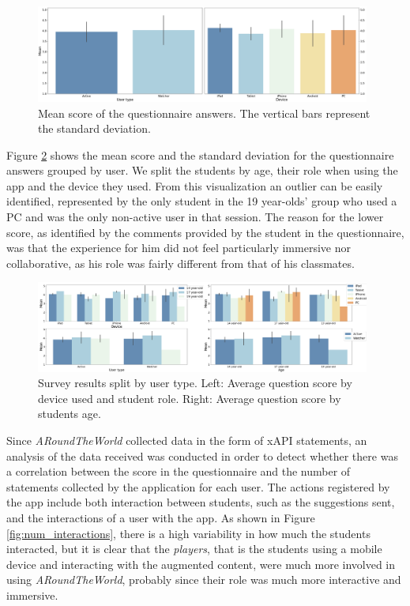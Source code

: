 \documentclass[pdflatex,sn-basic,iicol]{sn-jnl}%
\def\appname/{\textit{ARoundTheWorld}}
\begin{document}
\begin{figure}[htbp]
    \centering
    \includegraphics[width=0.98\textwidth]{imgs/survey_results_type_2.png}
    \caption{Mean score of the questionnaire answers. The vertical bars represent the standard deviation.}
    \label{fig:survey_split}
\end{figure}

Figure \ref{fig:survey_split_grouped} shows the mean score and the standard deviation for the questionnaire answers grouped by user. We split the students by age, their role when using the app and the device they used. From this visualization an outlier can be easily identified, represented by the only student in the 19 year-olds' group who used a PC and was the only non-active user in that session. The reason for the lower score, as identified by the comments provided by the student in the questionnaire, was that the experience for him did not feel particularly immersive nor collaborative, as his role was fairly different from that of his classmates. 

\begin{figure}[htbp]
    \centering
    \includegraphics[width=0.98\textwidth]{imgs/survey_results_grouped_2.png}
    \caption{Survey results split by user type. Left: Average question score by device used and student role. Right: Average question score by students age.}
    \label{fig:survey_split_grouped}
\end{figure}

Since \appname/ collected data in the form of xAPI statements, an analysis of the data received was conducted in order to detect whether there was a correlation between the score in the questionnaire and the number of statements collected by the application for each user. The actions registered by the app include both interaction between students, such as the suggestions sent, and the interactions of a user with the app. As shown in Figure \ref{fig:num_interactions}, there is a high variability in how much the students interacted, but it is clear that the \textit{players}, that is the students using a mobile device and interacting with the augmented content, were much more involved in using \appname/, probably since their role was much more interactive and immersive.
\end{document}
